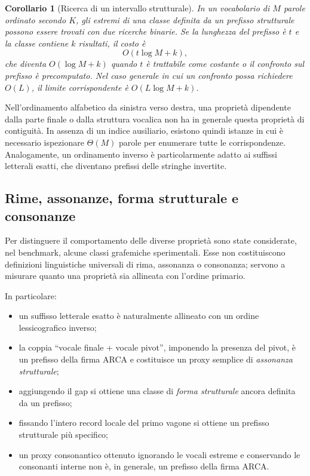 \documentclass[11pt,a4paper]{article}
\newtheorem{corollario}[teorema]{Corollario}
\theoremstyle{definition}
\theoremstyle{remark}
\begin{document}
\begin{corollario}[Ricerca di un intervallo strutturale]
In un vocabolario di $M$ parole ordinato secondo $K$, gli estremi di una classe definita da un prefisso strutturale possono essere trovati con due ricerche binarie. Se la lunghezza del prefisso è $t$ e la classe contiene $k$ risultati, il costo è
\[
  O(t\log M+k),
\]
che diventa $O(\log M+k)$ quando $t$ è trattabile come costante o il confronto sul prefisso è precomputato. Nel caso generale in cui un confronto possa richiedere $O(L)$, il limite corrispondente è $O(L\log M+k)$.
\end{corollario}

Nell'ordinamento alfabetico da sinistra verso destra, una proprietà dipendente dalla parte finale o dalla struttura vocalica non ha in generale questa proprietà di contiguità. In assenza di un indice ausiliario, esistono quindi istanze in cui è necessario ispezionare $\Theta(M)$ parole per enumerare tutte le corrispondenze. Analogamente, un ordinamento inverso è particolarmente adatto ai suffissi letterali esatti, che diventano prefissi delle stringhe invertite.

\subsection{Rime, assonanze, forma strutturale e consonanze}

Per distinguere il comportamento delle diverse proprietà sono state considerate, nel benchmark, alcune classi grafemiche sperimentali. Esse non costituiscono definizioni linguistiche universali di rima, assonanza o consonanza; servono a misurare quanto una proprietà sia allineata con l'ordine primario.

In particolare:
\begin{itemize}
  \item un suffisso letterale esatto è naturalmente allineato con un ordine lessicografico inverso;
  \item la coppia ``vocale finale + vocale pivot'', imponendo la presenza del pivot, è un prefisso della firma ARCA e costituisce un proxy semplice di \emph{assonanza strutturale};
  \item aggiungendo il gap si ottiene una classe di \emph{forma strutturale} ancora definita da un prefisso;
  \item fissando l'intero record locale del primo vagone si ottiene un prefisso strutturale più specifico;
  \item un proxy consonantico ottenuto ignorando le vocali estreme e conservando le consonanti interne non è, in generale, un prefisso della firma ARCA.
\end{itemize}
\end{document}
